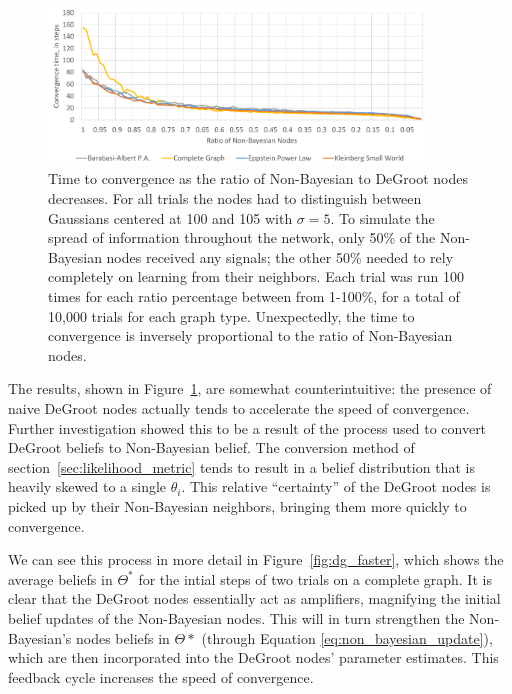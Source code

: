 \documentclass[letterpaper, 11pt, conference]{ieeeconf}
\begin{document}
\begin{figure}[t]
\centering
\includegraphics[width=0.9\textwidth]{figures/nb_ratio}
\caption{Time to convergence as the ratio of Non-Bayesian to DeGroot nodes decreases. For all trials the nodes had to distinguish between Gaussians centered at 100 and 105 with $\sigma=5$. To simulate the spread of information throughout the network, only 50\% of the Non-Bayesian nodes received any signals; the other 50\% needed to rely completely on learning from their neighbors. Each trial was run 100 times for each ratio percentage between from 1-100\%, for a total of 10,000 trials for each graph type. Unexpectedly, the time to convergence is inversely proportional to the ratio of Non-Bayesian nodes.}
\label{fig:nb_ratio}
\end{figure}

The results, shown in Figure~\ref{fig:nb_ratio}, are somewhat counterintuitive: the presence of naive DeGroot nodes actually tends to accelerate the speed of convergence.  Further investigation showed this to be a result of the process used to convert DeGroot beliefs to Non-Bayesian belief.  The conversion method of section~\ref{sec:likelihood_metric} tends to result in a belief distribution that is heavily skewed to a single $\theta_i$.  This relative ``certainty'' of the DeGroot nodes is picked up by their Non-Bayesian neighbors, bringing them more quickly to convergence.

We can see this process in more detail in Figure~\ref{fig:dg_faster}, which shows the average beliefs in $\Theta^*$ for the intial steps of two trials on a complete graph. It is clear that the DeGroot nodes essentially act as amplifiers, magnifying the initial belief updates of the Non-Bayesian nodes. This will in turn strengthen the Non-Bayesian's nodes beliefs in $\Theta*$ (through Equation \ref{eq:non_bayesian_update}), which are then incorporated into the DeGroot nodes' parameter estimates. This feedback cycle increases the speed of convergence.
\end{document}
